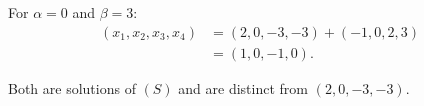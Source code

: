 \begin{enumerate}[label=\alph*)]
\begin{answer}
    For $\alpha=0$ and $\beta=3$:
    $$
    \begin{aligned}
    (x_1,x_2,x_3,x_4)
    &=(2,0,-3,-3)+(-1,0,2,3)\\
    &=\boxed{(1,0,-1,0)}.
    \end{aligned}
    $$

    Both are solutions of $(S)$ and are distinct from
    $(2,0,-3,-3)$.
\end{answer}

\end{enumerate}
